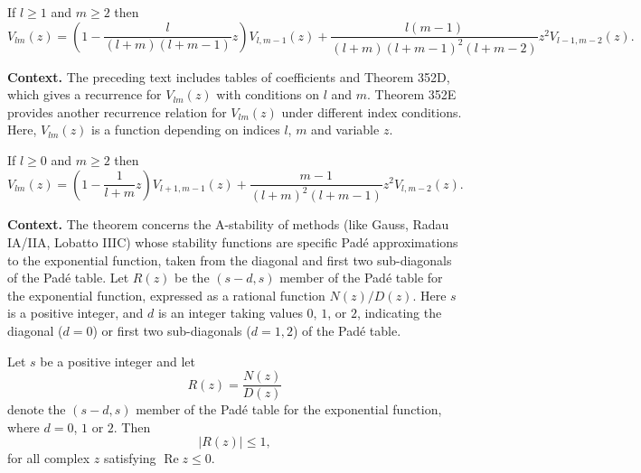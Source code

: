\begin{theorem}

  \label{thm:352D}
If $l \geq 1$ and $m \geq 2$ then
\[
V_{lm}(z) = \left(1 - \frac{l}{(l+m)(l+m-1)}z\right) V_{l,m-1}(z)
+ \frac{l(m-1)}{(l+m)(l+m-1)^2(l+m-2)} z^2 V_{l-1,m-2}(z).
\]
\end{theorem}

\noindent\textbf{Context.}
The preceding text includes tables of coefficients and Theorem 352D, which gives a recurrence for $V_{lm}(z)$ with conditions on $l$ and $m$. Theorem 352E provides another recurrence relation for $V_{lm}(z)$ under different index conditions. Here, $V_{lm}(z)$ is a function depending on indices $l$, $m$ and variable $z$.

\begin{theorem}

  \label{thm:352E}
If $l \geq 0$ and $m \geq 2$ then
\[
V_{lm}(z) = \left(1 - \frac{1}{l+m}z\right) V_{l+1,m-1}(z) + \frac{m-1}{(l+m)^2(l+m-1)}z^2 V_{l,m-2}(z).
\]
\end{theorem}

\noindent\textbf{Context.}
The theorem concerns the A-stability of methods (like Gauss, Radau IA/IIA, Lobatto IIIC) whose stability functions are specific Pad\'e approximations to the exponential function, taken from the diagonal and first two sub-diagonals of the Pad\'e table. Let $R(z)$ be the $(s-d, s)$ member of the Pad\'e table for the exponential function, expressed as a rational function $N(z)/D(z)$. Here $s$ is a positive integer, and $d$ is an integer taking values $0$, $1$, or $2$, indicating the diagonal ($d=0$) or first two sub-diagonals ($d=1,2$) of the Pad\'e table.

\begin{theorem}

  \label{thm:353A}
Let $s$ be a positive integer and let
\[
R(z)=\frac{N(z)}{D(z)}
\]
denote the $(s-d,s)$ member of the Pad\'e table for the exponential function,
where $d=0$, $1$ or $2$. Then
\[
|R(z)|\leq 1,
\]
for all complex $z$ satisfying $\operatorname{Re}z\leq 0$.
\end{theorem}

